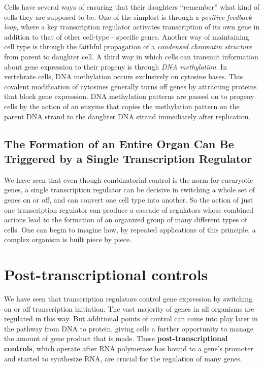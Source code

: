 Cells have several ways of ensuring that their daughters “remember”
what kind of cells they are supposed to be. One of the simplest is through
a \textit{positive feedback loop}, where a key transcription regulator activates
transcription of its own gene in addition to that of other cell-type - specific
genes. Another way of maintaining cell type is through
the faithful propagation of a \textit{condensed chromatin structure} from parent
to daughter cell.
A third way in which cells can transmit information about gene expression
to their progeny is through \textit{DNA methylation}. In vertebrate cells,
DNA methylation occurs exclusively on cytosine bases. This
covalent modification of cytosines generally turns off genes by attracting
proteins that block gene expression. DNA methylation patterns are
passed on to progeny cells by the action of an enzyme that copies the
methylation pattern on the parent DNA strand to the daughter DNA strand
immediately after replication.

\subsection{The Formation of an Entire Organ Can Be Triggered by a Single Transcription Regulator}

We have seen that even though combinatorial control is the norm for
eucaryotic genes, a single transcription regulator can be decisive in
switching a whole set of genes on or off, and can convert one cell type
into another. So the action of just one transcription regulator
can produce a cascade of regulators whose combined actions lead
to the formation of an organized group of many different types of cells.
One can begin to imagine how, by repeated applications of this principle,
a complex organism is built piece by piece.

\section{Post-transcriptional controls}

We have seen that transcription regulators control gene expression by
switching on or off transcription initiation. The vast majority of genes
in all organisms are regulated in this way. But additional points of control
can come into play later in the pathway from DNA to protein, giving
cells a further opportunity to manage the amount of gene product that
is made. These \textbf{post-transcriptional controls}, which operate after RNA
polymerase has bound to a gene’s promoter and started to synthesize
RNA, are crucial for the regulation of many genes.

